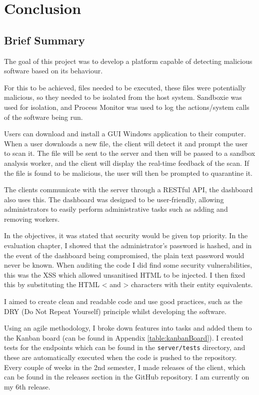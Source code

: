 \chapter{Conclusion}

\section{Brief Summary}
The goal of this project was to develop a platform capable
of detecting malicious software based on its behaviour.

For this to be achieved, files needed to be executed,
these files were potentially malicious,
so they needed to be isolated from the host system.
Sandboxie was used for isolation,
and Process Monitor was used to log
the actions/system calls of the software being run.

Users can download and install a GUI Windows application to their computer.
When a user downloads a new file, the client will detect it and prompt the user to scan it.
The file will be sent to the server and then will be passed to a sandbox analysis worker,
and the client will display the real-time feedback of the scan.
If the file is found to be malicious, the user will then be prompted to quarantine it.

The clients communicate with the server through a RESTful API,
the dashboard also uses this.
The dashboard was designed to be user-friendly,
allowing administrators to easily perform administrative tasks
such as adding and removing workers.

In the objectives, it was stated that security would be given top priority.
In the evaluation chapter, I showed that the administrator's password is hashed,
and in the event of the dashboard being compromised,
the plain text password would never be known.
When auditing the code I did find some security vulnerabilities,
this was the XSS which allowed unsanitised HTML to be injected.
I then fixed this by substituting the HTML < and >
characters with their entity equivalents.

I aimed to create clean and readable code and use good practices,
such as the DRY (Do Not Repeat Yourself)
principle whilst developing the software.

Using an agile methodology,
I broke down features into tasks and added them to the Kanban board
(can be found in Appendix \ref{table:kanbanBoard}).
I created tests for the endpoints which can be found in the \texttt{server/tests} directory,
and these are automatically executed when the code is pushed to the repository.
Every couple of weeks in the 2nd semester, I made releases of the client,
which can be found in the releases section in the GitHub repository.
I am currently on my 6th release.

